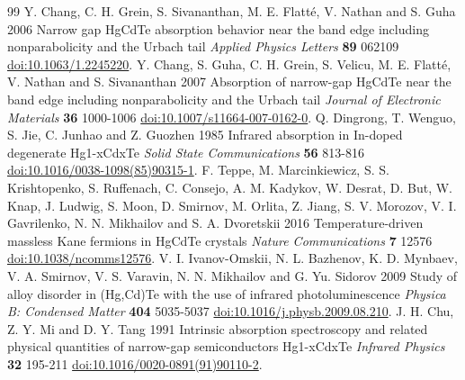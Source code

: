 \begin{thebibliography}{99}
 Y. Chang, C. H. Grein, S. Sivananthan, M. E. Flatté, V. Nathan and S. Guha 2006 Narrow gap HgCdTe absorption behavior near the band edge including nonparabolicity and the Urbach tail \textit{Applied Physics Letters} \textbf{89} 062109 \href{https://doi.org/10.1063/1.2245220}{doi:10.1063/1.2245220}.
 Y. Chang, S. Guha, C. H. Grein, S. Velicu, M. E. Flatté, V. Nathan and S. Sivananthan 2007 Absorption of narrow-gap HgCdTe near the band edge including nonparabolicity and the Urbach tail \textit{Journal of Electronic Materials} \textbf{36} 1000-1006 \href{https://doi.org/10.1007/s11664-007-0162-0}{doi:10.1007/s11664-007-0162-0}.
 Q. Dingrong, T. Wenguo, S. Jie, C. Junhao and Z. Guozhen 1985 Infrared absorption in In-doped degenerate Hg1-xCdxTe \textit{Solid State Communications} \textbf{56} 813-816 \href{https://doi.org/10.1016/0038-1098(85)90315-1}{doi:10.1016/0038-1098(85)90315-1}.
 F. Teppe, M. Marcinkiewicz, S. S. Krishtopenko, S. Ruffenach, C. Consejo, A. M. Kadykov, W. Desrat, D. But, W. Knap, J. Ludwig, S. Moon, D. Smirnov, M. Orlita, Z. Jiang, S. V. Morozov, V. I. Gavrilenko, N. N. Mikhailov and S. A. Dvoretskii 2016 Temperature-driven massless Kane fermions in HgCdTe crystals \textit{Nature Communications} \textbf{7} 12576 \href{https://doi.org/10.1038/ncomms12576}{doi:10.1038/ncomms12576}.
 V. I. Ivanov-Omskii, N. L. Bazhenov, K. D. Mynbaev, V. A. Smirnov, V. S. Varavin, N. N. Mikhailov and G. Yu. Sidorov 2009 Study of alloy disorder in (Hg,Cd)Te with the use of infrared photoluminescence \textit{Physica B: Condensed Matter} \textbf{404} 5035-5037 \href{https://doi.org/10.1016/j.physb.2009.08.210}{doi:10.1016/j.physb.2009.08.210}.
 J. H. Chu, Z. Y. Mi and D. Y. Tang 1991 Intrinsic absorption spectroscopy and related physical quantities of narrow-gap semiconductors Hg1-xCdxTe \textit{Infrared Physics} \textbf{32} 195-211 \href{https://doi.org/10.1016/0020-0891(91)90110-2}{doi:10.1016/0020-0891(91)90110-2}.
\end{thebibliography}

